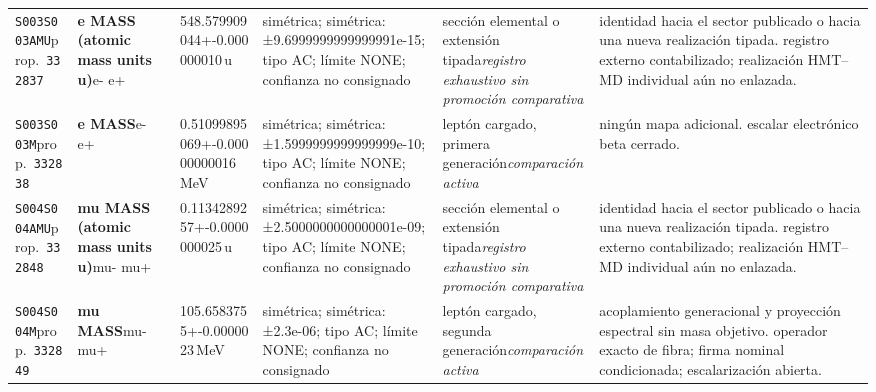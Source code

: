 \begin{landscape}
\begin{longtable}{L{1.85cm}L{4.45cm}L{2.35cm}L{4.05cm}L{3.35cm}L{7.15cm}}
\texttt{S003}\newline \texttt{S003AMU}\newline prop.\ \texttt{332837} & \textbf{e MASS (atomic mass units u)}\newline e- \textbar{}\allowbreak{} e+ & 548.579909044+-0.000000010\,u & simétrica; simétrica: ±9.6999999999999991e-15; tipo AC; límite NONE; confianza no consignado & sección elemental o extensión tipada\newline \emph{registro exhaustivo sin promoción comparativa} & identidad hacia el sector publicado o hacia una nueva realización tipada. registro externo contabilizado; realización HMT--MD individual aún no enlazada. \\
\texttt{S003}\newline \texttt{S003M}\newline prop.\ \texttt{332838} & \textbf{e MASS}\newline e- \textbar{}\allowbreak{} e+ & 0.51099895069+-0.00000000016\,MeV & simétrica; simétrica: ±1.5999999999999999e-10; tipo AC; límite NONE; confianza no consignado & leptón cargado, primera generación\newline \emph{comparación activa} & ningún mapa adicional. escalar electrónico beta cerrado. \\
\texttt{S004}\newline \texttt{S004AMU}\newline prop.\ \texttt{332848} & \textbf{mu MASS (atomic mass units u)}\newline mu- \textbar{}\allowbreak{} mu+ & 0.1134289257+-0.0000000025\,u & simétrica; simétrica: ±2.5000000000000001e-09; tipo AC; límite NONE; confianza no consignado & sección elemental o extensión tipada\newline \emph{registro exhaustivo sin promoción comparativa} & identidad hacia el sector publicado o hacia una nueva realización tipada. registro externo contabilizado; realización HMT--MD individual aún no enlazada. \\
\texttt{S004}\newline \texttt{S004M}\newline prop.\ \texttt{332849} & \textbf{mu MASS}\newline mu- \textbar{}\allowbreak{} mu+ & 105.6583755+-0.0000023\,MeV & simétrica; simétrica: ±2.3e-06; tipo AC; límite NONE; confianza no consignado & leptón cargado, segunda generación\newline \emph{comparación activa} & acoplamiento generacional y proyección espectral sin masa objetivo. operador exacto de fibra; firma nominal condicionada; escalarización abierta. \\

\end{longtable}
\end{landscape}
